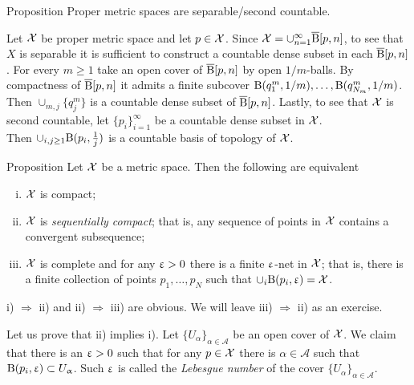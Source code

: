 \begin{thm}{Proposition}
Proper metric spaces are separable/second countable.
\end{thm}
Let $\mathcal{X}$ be  proper metric space and let $p\in \spc{X}$.
Since $\spc{X}=\cup_{n=1}^\infty\cBall[p,n]$, to see that $X$ is separable it is sufficient to construct a countable dense subset in  each $\overline{\mathrm{B}}{}[p,n]$. 
For every $m\ge 1$  take  an open cover of $\overline{\mathrm{B}}{}[p,n]$ by open $1/m$-balls.
By compactness of $\overline{\mathrm{B}}{}[p,n]$ it admits a finite subcover $\mathrm{B}{}(q^m_1,1/m),\ldots, \mathrm{B}{}(q^m_{N_m},1/m)$. Then $\cup_{m, j} \{q^m_j\}$ is a countable dense subset of $\overline{\mathrm{B}}{}[p,n]$.
Lastly, to see that $\mathcal{X}$ is second countable, let $\{p_i\}_{i=1}^\infty$ be a countable dense subset in $\mathcal{X}$. \\ Then $\cup_{i,j\ge 1} \oBall(p_i,\frac 1 j)$ is a countable basis of topology of $\mathcal{X}$.
\qeds


\begin{thm}{Proposition}\label{compact=seq-compact}
Let $\mathcal{X}$ be a metric space. Then the following are equivalent
\begin{enumerate}[i)]
\item $\mathcal{X}$ is compact;
\item $\mathcal{X}$ is \emph{sequentially compact}; that is, any sequence of points in $\mathcal{X}$ contains a convergent subsequence;
\item $\mathcal{X}$ is complete and for any $\upvarepsilon>0$ there is a finite $\upvarepsilon$-net in $\mathcal{X}$; that is, there is a finite collection of points $p_1,\ldots,p_{N}$ such that $\cup_i\oBall(p_i,\eps)=\spc{X}$.
\end{enumerate}
\end{thm}
i) $\Rightarrow$ ii)  and ii) $\Rightarrow$  iii) are  obvious. We will leave iii) $\Rightarrow$  ii) as an exercise.

Let us prove that ii) implies i). Let $\{U_\alpha\}_{\alpha\in\mathcal A}$ be an open cover of $\mathcal{X}$. 
We claim that there is an $\upvarepsilon>0$ such that for any $p\in \spc{X}$ there is $\alpha\in\mathcal A$ such that $\oBall(p_i,\eps)\subset U_\alpha$. Such $\upvarepsilon$ is called the \emph{ Lebesgue number}  of the cover  $\{U_\alpha\}_{\alpha\in\mathcal A}$.

